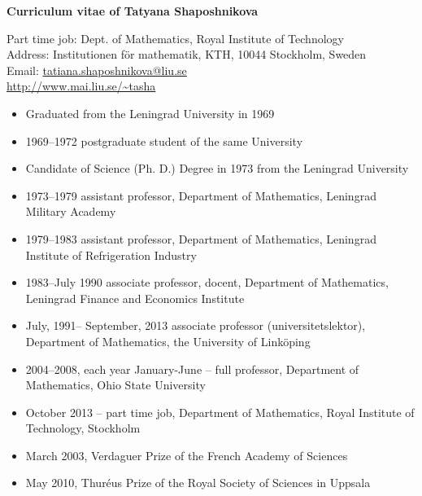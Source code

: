 \documentclass{article}
\begin{document}
\parindent=0pt
\addtolength{\parskip}{4pt}
\addtolength{\textwidth}{10em}
\addtolength{\textheight}{12em}
\def\tc{\mathaccent"7017}


\centerline{\large{\bf Curriculum vitae of Tatyana Shaposhnikova}}

\noindent
Part time job: Dept. of Mathematics, Royal Institute of Technology\\
Address: Institutionen f\"or mathematik, KTH, 10044 Stockholm, Sweden\\
Email: \href{mailto:tatiana.shaposhnikova@liu.se}{tatiana.shaposhnikova@liu.se}\\
\url{http://www.mai.liu.se/~tasha}


\begin{itemize}
         \item Graduated from the Leningrad University in 1969
         \item 1969--1972 postgraduate student of the same University
         \item Candidate of Science (Ph. D.) Degree in 1973 from the
Leningrad University
\end{itemize}

\begin{itemize}
         \item 1973--1979  assistant professor, Department of
Mathematics, Leningrad
          Military Academy
         \item 1979--1983  assistant professor, Department of
Mathematics, Leningrad
          Institute of Refrigeration Industry
          \item 1983--July 1990  associate professor, docent,
Department of Mathematics, Leningrad Finance
         and Economics Institute
          \item  July, 1991-- September, 2013   associate professor
(universitetslektor), Department of Mathematics, the
         University of Link\"oping
         \item 2004--2008, each year January-June -- full professor, Department of Mathematics, Ohio State University
        \item October 2013 -- part time job,  Department of Mathematics, Royal Institute of Technology, Stockholm

\end{itemize}

\begin{itemize}
         \item March 2003, Verdaguer Prize of the French Academy of Sciences
         \item May 2010, Thur\'eus Prize of the Royal Society of Sciences in Uppsala
\end{itemize}
\end{document}
